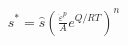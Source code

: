 \documentclass[preview]{standalone}
\begin{document}
\begin{align*}
s^* = \hat{s}\left(\frac{\dot{\varepsilon}^p}{A} e^{Q/RT}\right)^n
\end{align*}
\end{document}
